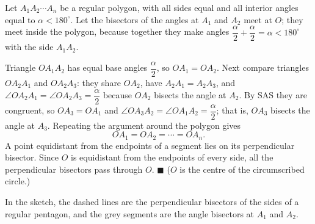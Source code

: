 Let $A_1A_2\cdots A_n$ be a regular polygon, with all sides equal and all interior angles equal to $\alpha<180^\circ$. Let the bisectors of the angles at $A_1$ and $A_2$ meet at $O$; they meet inside the polygon, because together they make angles $\dfrac\alpha2+\dfrac\alpha2=\alpha<180^\circ$ with the side $A_1A_2$.

Triangle $OA_1A_2$ has equal base angles $\dfrac\alpha2$, so $OA_1=OA_2$. Next compare triangles $OA_2A_1$ and $OA_2A_3$: they share $OA_2$, have $A_2A_1=A_2A_3$, and $\angle OA_2A_1=\angle OA_2A_3=\dfrac\alpha2$ because $OA_2$ bisects the angle at $A_2$. By SAS they are congruent, so $OA_3=OA_1$ and $\angle OA_3A_2=\angle OA_1A_2=\dfrac\alpha2$; that is, $OA_3$ bisects the angle at $A_3$. Repeating the argument around the polygon gives
\[OA_1=OA_2=\cdots=OA_n.\]
A point equidistant from the endpoints of a segment lies on its perpendicular bisector. Since $O$ is equidistant from the endpoints of every side, all the perpendicular bisectors pass through $O$. $\blacksquare$ ($O$ is the centre of the circumscribed circle.)


In the sketch, the dashed lines are the perpendicular bisectors of the sides of a regular pentagon, and the grey segments are the angle bisectors at $A_1$ and $A_2$.
